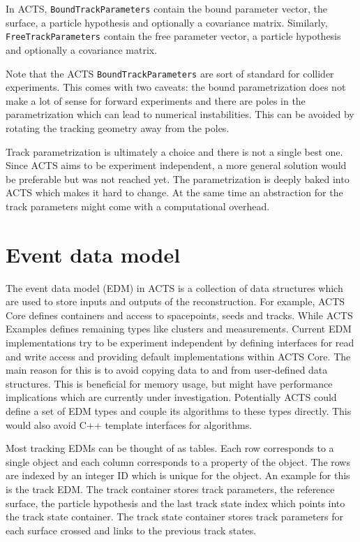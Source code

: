 In ACTS, \texttt{BoundTrackParameters} contain the bound parameter vector, the surface, a particle hypothesis and optionally a covariance matrix. Similarly, \texttt{FreeTrackParameters} contain the free parameter vector, a particle hypothesis and optionally a covariance matrix.

Note that the ACTS \texttt{BoundTrackParameters} are sort of standard for collider experiments. This comes with two caveats: the bound parametrization does not make a lot of sense for forward experiments and there are poles in the parametrization which can lead to numerical instabilities. This can be avoided by rotating the tracking geometry away from the poles.

Track parametrization is ultimately a choice and there is not a single best one. Since ACTS aims to be experiment independent, a more general solution would be preferable but was not reached yet. The parametrization is deeply baked into ACTS which makes it hard to change. At the same time an abstraction for the track parameters might come with a computational overhead.


\section{Event data model}

The event data model (EDM) in ACTS is a collection of data structures which are used to store inputs and outputs of the reconstruction. For example, ACTS Core defines containers and access to spacepoints, seeds and tracks. While ACTS Examples defines remaining types like clusters and measurements. Current EDM implementations try to be experiment independent by defining interfaces for read and write access and providing default implementations within ACTS Core. The main reason for this is to avoid copying data to and from user-defined data structures. This is beneficial for memory usage, but might have performance implications which are currently under investigation. Potentially ACTS could define a set of EDM types and couple its algorithms to these types directly. This would also avoid C++ template interfaces for algorithms.

Most tracking EDMs can be thought of as tables. Each row corresponds to a single object and each column corresponds to a property of the object. The rows are indexed by an integer ID which is unique for the object. An example for this is the track EDM. The track container stores track parameters, the reference surface, the particle hypothesis and the last track state index which points into the track state container. The track state container stores track parameters for each surface crossed and links to the previous track states.

